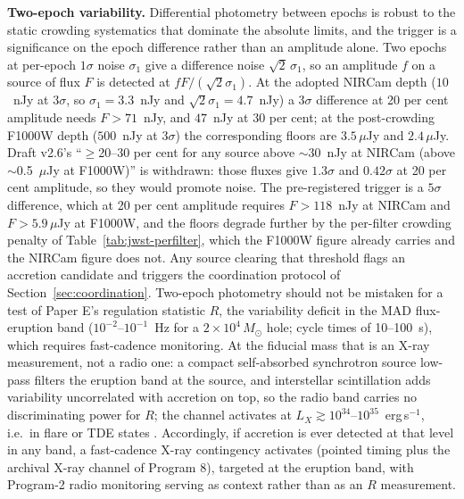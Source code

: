 \documentclass[11pt]{article}
\newcommand{\msun}{\ensuremath{M_\odot}}
\begin{document}
\textbf{Two-epoch variability.} Differential photometry between epochs is robust to the static crowding systematics that dominate the absolute limits, and the trigger is a significance on the epoch difference rather than an amplitude alone. Two epochs at per-epoch $1\sigma$ noise $\sigma_{1}$ give a difference noise $\sqrt{2}\,\sigma_{1}$, so an amplitude $f$ on a source of flux $F$ is detected at $fF/(\sqrt{2}\sigma_{1})$. At the adopted NIRCam depth ($10$~nJy at $3\sigma$, so $\sigma_{1} = 3.3$~nJy and $\sqrt{2}\sigma_{1} = 4.7$~nJy) a $3\sigma$ difference at 20 per cent amplitude needs $F > 71$~nJy, and $47$~nJy at 30 per cent; at the post-crowding F1000W depth ($500$~nJy at $3\sigma$) the corresponding floors are $3.5\,\mu$Jy and $2.4\,\mu$Jy. Draft v2.6's ``$\geq$20--30 per cent for any source above $\sim$30~nJy at NIRCam (above $\sim$0.5~$\mu$Jy at F1000W)'' is withdrawn: those fluxes give $1.3\sigma$ and $0.42\sigma$ at 20 per cent amplitude, so they would promote noise. The pre-registered trigger is a $5\sigma$ difference, which at 20 per cent amplitude requires $F > 118$~nJy at NIRCam and $F > 5.9\,\mu$Jy at F1000W, and the floors degrade further by the per-filter crowding penalty of Table~\ref{tab:jwst-perfilter}, which the F1000W figure already carries and the NIRCam figure does not. Any source clearing that threshold flags an accretion candidate and triggers the coordination protocol of Section~\ref{sec:coordination}. Two-epoch photometry should not be mistaken for a test of Paper E's regulation statistic $R$, the variability deficit in the MAD flux-eruption band ($10^{-2}$--$10^{-1}$~Hz for a $2\times10^{4}\,\msun$ hole; cycle times of 10--100~s), which requires fast-cadence monitoring. At the fiducial mass that is an X-ray measurement, not a radio one: a compact self-absorbed synchrotron source low-pass filters the eruption band at the source, and interstellar scintillation adds variability uncorrelated with accretion on top, so the radio band carries no discriminating power for $R$; the channel activates at $L_X \gtrsim 10^{34}$--$10^{35}$~erg\,s$^{-1}$, i.e.\ in flare or TDE states \citep{Swanson2026Engineered}. Accordingly, if accretion is ever detected at that level in any band, a fast-cadence X-ray contingency activates (pointed timing plus the archival X-ray channel of Program 8), targeted at the eruption band, with Program-2 radio monitoring serving as context rather than as an $R$ measurement.
\end{document}
